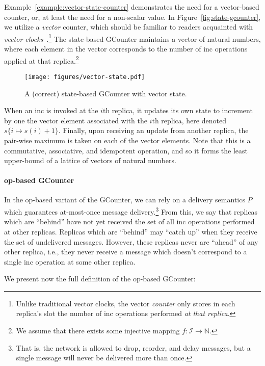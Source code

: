 Example~\ref{example:vector-state-counter} demonstrates the need for a
vector-based counter, or, at least the need for a non-scalar value. In
Figure~\ref{fig:state-gcounter}, we utilize a \emph{vector} counter, which
should be familiar to readers acquainted with \emph{vector
clocks}~\citep{lamport78}.\footnote{Unlike traditional vector clocks, the vector
\emph{counter} only stores in each replica's slot the number of \textsf{inc}
operations performed \emph{at that replica}.} The state-based GCounter maintains
a vector of natural numbers, where each element in the vector corresponds to the
number of \textsf{inc} operations applied at that replica.\footnote{We assume
that there exists some injective mapping $f : \mathcal{I} \to \mathbb{N}$.}

\begin{figure}[H]
  \centering
  \texttt{[image: figures/vector-state.pdf]}
  \caption{A (correct) state-based GCounter with vector state.}
\end{figure}

When an \textsf{inc} is invoked at the $i$th replica, it updates its own state
to increment by one the vector element associated with the $i$th replica, here
denoted $s\{i \mapsto s(i) + 1\}$. Finally, upon receiving an update from
another replica, the pair-wise maximum is taken on each of the vector elements.
Note that this is a commutative, associative, and idempotent operation, and so
it forms the least upper-bound of a lattice of vectors of natural numbers.

\paragraph{op-based GCounter} In the op-based variant of the GCounter, we can
rely on a delivery semantics $P$ which guarantees at-most-once message
delivery.\footnote{That is, the network is allowed to drop, reorder, and delay
messages, but a single message will never be delivered more than once.} From
this, we say that replicas which are ``behind'' have not yet received the set of
all \textsf{inc} operations performed at other replicas. Replicas which are
``behind'' may ``catch up'' when they receive the set of undelivered messages.
However, these replicas never are ``ahead'' of any other replica, i.e., they
never receive a message which doesn't correspond to a single \textsf{inc}
operation at some other replica.

We present now the full definition of the op-based GCounter:

